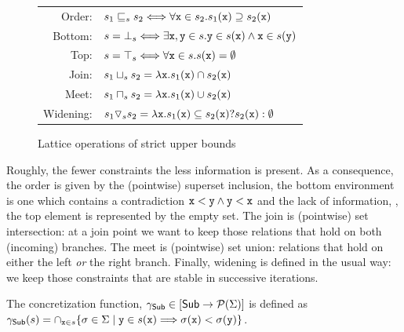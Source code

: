 \documentclass{elsart}
\begin{document}
\begin{figure}
\small
\begin{tabular}{rl}
Order:& $ s_1 \sqsubseteq_s s_2 \Longleftrightarrow \forall \mathtt{x} \in s_2. s_1(\mathtt{x}) \supseteq s_2(\mathtt{x})$ \\
Bottom:& $ s = {\bot}_s \Longleftrightarrow  \exists \mathtt{x,y} \in s. \mathtt{y} \in s(\mathtt{x}) \wedge \mathtt{x} \in s(\mathtt{y})$ \\
Top:& $ s = {\top}_s \Longleftrightarrow \forall \mathtt{x} \in s. s(\mathtt{x}) = \emptyset$\\
Join:& $ s_1 \sqcup_s s_2 = \lambda \mathtt{x}. s_1(\mathtt{x}) \cap s_2(\mathtt{x}) $ \\
Meet:& $ s_1 \sqcap_s s_2 = \lambda \mathtt{x}. s_1(\mathtt{x}) \cup s_2(\mathtt{x}) $  \\
Widening:&  $s_1 \triangledown_s s_2 = \lambda \mathtt{x}. s_1(\mathtt{x}) \subseteq s_2(\mathtt{x}) ? s_2(\mathtt{x}) : \emptyset $
\end{tabular}
\caption{Lattice operations of strict upper bounds}
\label{tab:sub}
\end{figure}
Roughly, the fewer constraints the less information is  present.
As a consequence, the order is given by the (pointwise) superset inclusion, the bottom environment is one which contains a contradiction $\mathtt{x} < \mathtt{y} \wedge \mathtt{y} < \mathtt{x}$ and the lack of information, \ie, the top element is represented by the empty set.
The join is (pointwise) set intersection: at a join point we want to keep those relations that hold on both (incoming) branches.
The meet is (pointwise) set union: relations that hold on either the left \emph{or} the right branch.
Finally, widening is defined in the usual way: we keep those
constraints that are stable in successive iterations.

The concretization function, $\gamma_{\mathsf{Sub}} \in [\mathsf{Sub} \rightarrow\mathcal{P}{(\Sigma)}]$ is defined as $\gamma_{\mathsf{Sub}}(s) = \cap_{\mathtt{x} \in s} \{ \sigma \in \Sigma \mid \mathtt{y} \in s(\mathtt{x}) \Longrightarrow \sigma(\mathtt{x}) < \sigma(\mathtt{y}) \}$.
\end{document}
